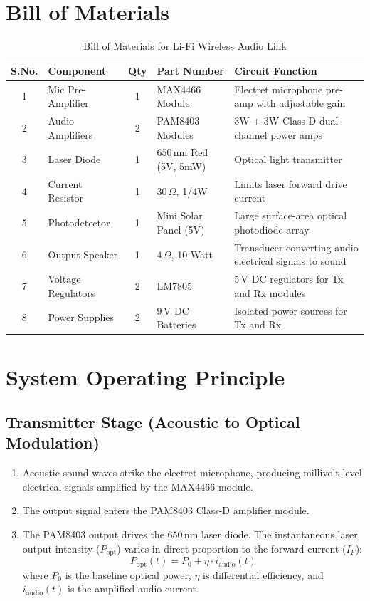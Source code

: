 \documentclass[11pt,a4paper]{article}
\begin{document}
\section{Bill of Materials}
\begin{table}[h!]
\centering
\caption{Bill of Materials for Li-Fi Wireless Audio Link}
\vspace{0.5em}
\begin{tabular}{@{}c l c l p{6cm}@{}}
\toprule
\textbf{S.No.} & \textbf{Component} & \textbf{Qty} & \textbf{Part Number} & \textbf{Circuit Function} \\
\midrule
1 & Mic Pre-Amplifier & 1 & MAX4466 Module & Electret microphone pre-amp with adjustable gain \\
2 & Audio Amplifiers & 2 & PAM8403 Modules & 3W + 3W Class-D dual-channel power amps \\
3 & Laser Diode & 1 & $650\,\text{nm}$ Red (5V, 5mW) & Optical light transmitter \\
4 & Current Resistor & 1 & $30\,\Omega$, 1/4W & Limits laser forward drive current \\
5 & Photodetector & 1 & Mini Solar Panel (5V) & Large surface-area optical photodiode array \\
6 & Output Speaker & 1 & $4\,\Omega$, 10 Watt & Transducer converting audio electrical signals to sound \\
7 & Voltage Regulators & 2 & LM7805 & $5\,\text{V}$ DC regulators for Tx and Rx modules \\
8 & Power Supplies & 2 & $9\,\text{V}$ DC Batteries & Isolated power sources for Tx and Rx \\
\bottomrule
\end{tabular}
\end{table}

\section{System Operating Principle}

\subsection{Transmitter Stage (Acoustic to Optical Modulation)}
\begin{enumerate}
    \item Acoustic sound waves strike the electret microphone, producing millivolt-level electrical signals amplified by the MAX4466 module.
    \item The output signal enters the PAM8403 Class-D amplifier module.
    \item The PAM8403 output drives the $650\,\text{nm}$ laser diode. The instantaneous laser output intensity ($P_{\text{opt}}$) varies in direct proportion to the forward current ($I_F$):
    \begin{equation}
    P_{\text{opt}}(t) = P_0 + \eta \cdot i_{\text{audio}}(t)
    \end{equation}
    where $P_0$ is the baseline optical power, $\eta$ is differential efficiency, and $i_{\text{audio}}(t)$ is the amplified audio current.
\end{enumerate}
\end{document}
